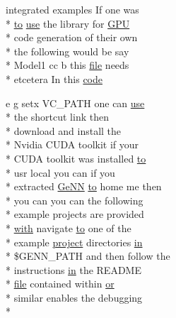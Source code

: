 \begin{DoxyCompactItemize}
integrated examples If one was \\*
\hyperlink{README_8txt_add1f2ee32acc15ef77f839d4382c9768}{to} \hyperlink{README_8txt_acf386c48a14a2099c9220d6bcde40fc8}{use} the library for \hyperlink{modelSpec_8h_a39cb9803524b6f3b783344b2f89867b4}{G\+P\+U} \\*
code generation of their own \\*
the following would be say \\*
Model1 cc b this \hyperlink{README_8txt_a6f45b2930c1b79b67034355b4701dc56}{file} needs \\*
etcetera In this \hyperlink{README_8txt_a84d41a61227d98dc461b51f8ecf8d8c0}{code}
\item 
e g setx V\+C\+\_\+\+P\+A\+T\+H one can \hyperlink{README_8txt_acf386c48a14a2099c9220d6bcde40fc8}{use} \\*
the shortcut link then \\*
download and install the \\*
Nvidia C\+U\+D\+A toolkit if your \\*
C\+U\+D\+A toolkit was installed \hyperlink{README_8txt_add1f2ee32acc15ef77f839d4382c9768}{to} \\*
usr local you can if you \\*
extracted \hyperlink{README_8txt_a431a8d9aae97c72793fee7c3edd68559}{Ge\+N\+N} \hyperlink{README_8txt_add1f2ee32acc15ef77f839d4382c9768}{to} home me then \\*
you can you can the following \\*
example projects are provided \\*
\hyperlink{userproject_2OneComp__project_2README_8txt_ace09bb40fbf4457ad9a9340a67a4fa9a}{with} navigate \hyperlink{README_8txt_add1f2ee32acc15ef77f839d4382c9768}{to} one of the \\*
example \hyperlink{userproject_2SynDelay__project_2README_8txt_a762c750134e07a31b7965860fd292b51}{project} directories \hyperlink{README_8txt_a148897a6b2cc9cff25af80abb13426b0}{in} \\*
\$G\+E\+N\+N\+\_\+\+P\+A\+T\+H and then follow the \\*
instructions \hyperlink{README_8txt_a148897a6b2cc9cff25af80abb13426b0}{in} the R\+E\+A\+D\+M\+E \\*
\hyperlink{README_8txt_a6f45b2930c1b79b67034355b4701dc56}{file} contained within \hyperlink{userproject_2PoissonIzh__project_2README_8txt_ad4021097ab0ba066271614bf3f4c2e27}{or} \\*
similar enables the debugging \\*

\end{DoxyCompactItemize}

